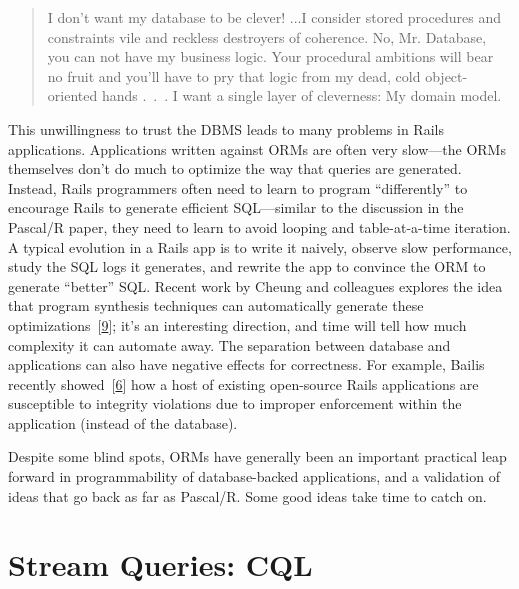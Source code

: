 \documentclass[b5paper,11pt,twoside,openright]{book}
\newcommand\Section[2]{
  \hypertarget{#1}{
    \section{#2}\label{#1}
  }
}
\begin{document}
\begin{quote}
  I don't want my database to be clever! ...I consider stored procedures
  and constraints vile and reckless destroyers of coherence. No, Mr.
  Database, you can not have my business logic. Your procedural ambitions
  will bear no fruit and you'll have to pry that logic from my dead, cold
  object-oriented hands \mbox{. . .} I want a single layer of cleverness: My
  domain model.
\end{quote}

This unwillingness to trust the DBMS leads to many problems in Rails
applications. Applications written against ORMs are often very
slow---the ORMs themselves don't do much to optimize the way that
queries are generated. Instead, Rails programmers often need to learn to
program ``differently'' to encourage Rails to generate efficient
SQL---similar to the discussion in the Pascal/R paper, they need to
learn to avoid looping and table-at-a-time iteration. A typical
evolution in a Rails app is to write it naively, observe slow
performance, study the SQL logs it generates, and rewrite the app to
convince the ORM to generate ``better'' SQL. Recent work by Cheung and
colleagues explores the idea that program synthesis techniques can
automatically generate these
optimizations~{{[}\protect\hyperlink{ref-statusquo}{9}{]}}; it's an
interesting direction, and time will tell how much complexity it can
automate away. The separation between database and applications can also
have negative effects for correctness. For example, Bailis recently
showed~{{[}\protect\hyperlink{ref-feral}{6}{]}} how a host of existing
open-source Rails applications are susceptible to integrity violations
due to improper enforcement within the application (instead of the
database).

Despite some blind spots, ORMs have generally been an important
practical leap forward in programmability of database-backed
applications, and a validation of ideas that go back as far as Pascal/R.
Some good ideas take time to catch on.

\Section{stream-queries-cql}{%
Stream Queries: CQL
}
\end{document}
